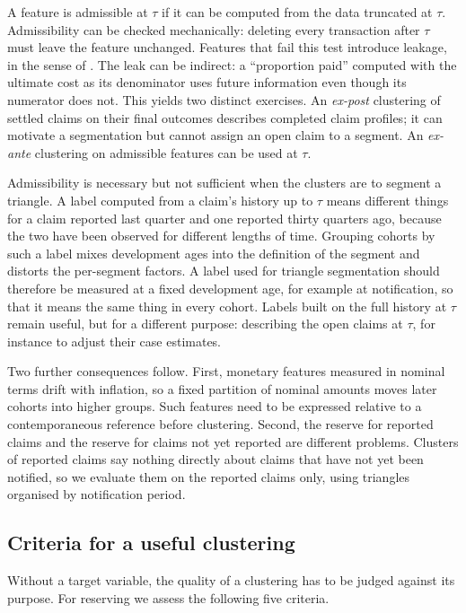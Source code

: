 A feature is admissible at $\tau$ if it can be computed from the data truncated at $\tau$. Admissibility can be checked mechanically: deleting every transaction after $\tau$ must leave the feature unchanged. Features that fail this test introduce leakage, in the sense of \textcite{kaufman2012leakage}. The leak can be indirect: a ``proportion paid'' computed with the ultimate cost as its denominator uses future information even though its numerator does not. This yields two distinct exercises. An \emph{ex-post} clustering of settled claims on their final outcomes describes completed claim profiles; it can motivate a segmentation but cannot assign an open claim to a segment. An \emph{ex-ante} clustering on admissible features can be used at $\tau$.

Admissibility is necessary but not sufficient when the clusters are to segment a triangle. A label computed from a claim's history up to $\tau$ means different things for a claim reported last quarter and one reported thirty quarters ago, because the two have been observed for different lengths of time. Grouping cohorts by such a label mixes development ages into the definition of the segment and distorts the per-segment factors. A label used for triangle segmentation should therefore be measured at a fixed development age, for example at notification, so that it means the same thing in every cohort. Labels built on the full history at $\tau$ remain useful, but for a different purpose: describing the open claims at $\tau$, for instance to adjust their case estimates.

Two further consequences follow. First, monetary features measured in nominal terms drift with inflation, so a fixed partition of nominal amounts moves later cohorts into higher groups. Such features need to be expressed relative to a contemporaneous reference before clustering. Second, the reserve for reported claims and the reserve for claims not yet reported are different problems. Clusters of reported claims say nothing directly about claims that have not yet been notified, so we evaluate them on the reported claims only, using triangles organised by notification period.

\subsection{Criteria for a useful clustering}
\label{sec:criteria}

Without a target variable, the quality of a clustering has to be judged against its purpose. For reserving we assess the following five criteria.


